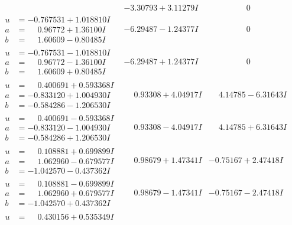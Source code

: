 \documentclass[1p]{elsarticle_modified}
\theoremstyle{definition}
\begin{document}
$$\begin{array}{c|c|c}
 & -3.30793 + 3.11279 I & \phantom{-0.000000 } 0 \\ \hline\begin{aligned}
u &= -0.767531 + 1.018810 I \\
a &= \phantom{-}0.96772 + 1.36100 I \\
b &= \phantom{-}1.60609 - 0.80485 I\end{aligned}
 & -6.29487 - 1.24377 I & \phantom{-0.000000 } 0 \\ \hline\begin{aligned}
u &= -0.767531 - 1.018810 I \\
a &= \phantom{-}0.96772 - 1.36100 I \\
b &= \phantom{-}1.60609 + 0.80485 I\end{aligned}
 & -6.29487 + 1.24377 I & \phantom{-0.000000 } 0 \\ \hline\begin{aligned}
u &= \phantom{-}0.400691 + 0.593368 I \\
a &= -0.833120 + 1.004930 I \\
b &= -0.584286 - 1.206530 I\end{aligned}
 & \phantom{-}0.93308 + 4.04917 I & \phantom{-}4.14785 - 6.31643 I \\ \hline\begin{aligned}
u &= \phantom{-}0.400691 - 0.593368 I \\
a &= -0.833120 - 1.004930 I \\
b &= -0.584286 + 1.206530 I\end{aligned}
 & \phantom{-}0.93308 - 4.04917 I & \phantom{-}4.14785 + 6.31643 I \\ \hline\begin{aligned}
u &= \phantom{-}0.108881 + 0.699899 I \\
a &= \phantom{-}1.062960 - 0.679577 I \\
b &= -1.042570 - 0.437362 I\end{aligned}
 & \phantom{-}0.98679 + 1.47341 I & -0.75167 + 2.47418 I \\ \hline\begin{aligned}
u &= \phantom{-}0.108881 - 0.699899 I \\
a &= \phantom{-}1.062960 + 0.679577 I \\
b &= -1.042570 + 0.437362 I\end{aligned}
 & \phantom{-}0.98679 - 1.47341 I & -0.75167 - 2.47418 I \\ \hline\begin{aligned}
u &= \phantom{-}0.430156 + 0.535349 I \\

\end{aligned}
\end{array}$$
\end{document}
